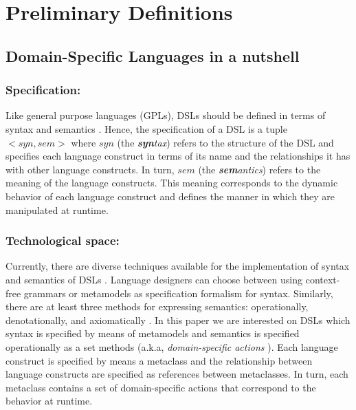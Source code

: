 \section{Preliminary Definitions}
\label{sec:background}

\subsection{Domain-Specific Languages in a nutshell}


\subsubsection{Specification:} Like general purpose languages (GPLs), DSLs should be defined in terms of syntax and semantics \cite{Harel:2004b}. Hence, the specification of a DSL is a tuple $<syn,sem>$ where $syn$ (the \textit{\textbf{syn}tax}) refers to the structure of the DSL and specifies each language construct in terms of its name and the relationships it has with other language constructs. In turn, $sem$ (the \textit{\textbf{sem}antics}) refers to the meaning of the language constructs. This meaning corresponds to the dynamic behavior of each language construct and defines the manner in which they are manipulated at runtime.

\vspace{-3mm}
\subsubsection{Technological space:} Currently, there are diverse techniques available for the implementation of syntax and semantics of DSLs \cite{Mernik:2005b}. Language designers can choose between using context-free grammars or metamodels as specification formalism for syntax. Similarly, there are at least three methods for expressing semantics: operationally, denotationally, and axiomatically \cite{Mosses:2001}. In this paper we are interested on DSLs which syntax is specified by means of metamodels and semantics is specified operationally as a set methods (a.k.a, \textit{domain-specific actions} \cite{Combemale:2013}). Each language construct is specified by means a metaclass and the relationship between language constructs are specified as references between metaclasses. In turn, each metaclass contains a set of domain-specific actions that correspond to the behavior at runtime.


